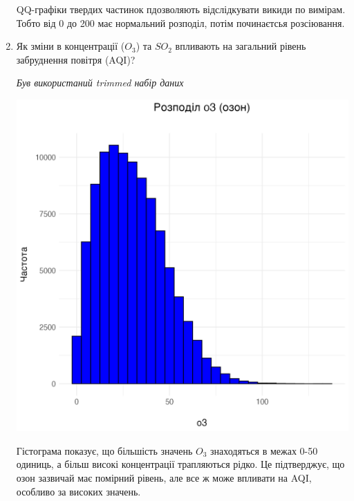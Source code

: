 \documentclass{article}
\begin{document}
\begin{enumerate}
    QQ-графіки твердих частинок пдозволяють відслідкувати викиди по вимірам. Тобто від 0 до 200 має нормальний розподіл, потім починаєтсья розсіювання.
    \item Як зміни в концентрації  ($O_3$)  та $SO_2$ впливають на загальний рівень забруднення повітря (AQI)?
    
    \quad \textit{Був використаний trimmed набір даних}

    \includegraphics[width=6in]{plots/question2/o3_plot.png}
    
    Гістограма показує, що більшість значень $O_3$ знаходяться в межах 0-50 одиниць, а більш високі концентрації трапляються рідко.
    Це підтверджує, що озон зазвичай має помірний рівень, але все ж може впливати на AQI, особливо за високих значень.
    

\end{enumerate}
\end{document}
